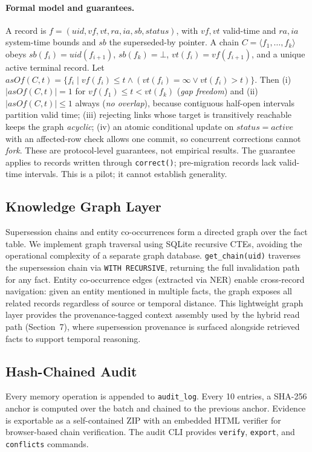 \documentclass{llncs}
\begin{document}
\paragraph{Formal model and guarantees.} A record is $f=(\mathit{uid},\mathit{vf},\mathit{vt},\mathit{ra},\mathit{ia},\mathit{sb},\mathit{status})$, with $\mathit{vf},\mathit{vt}$ valid-time and $\mathit{ra},\mathit{ia}$ system-time bounds and $\mathit{sb}$ the superseded-by pointer. A chain $C=\langle f_1,\ldots,f_k\rangle$ obeys $\mathit{sb}(f_i)=\mathit{uid}(f_{i+1})$, $\mathit{sb}(f_k)=\bot$, $\mathit{vt}(f_i)=\mathit{vf}(f_{i+1})$, and a unique active terminal record. Let $\mathit{asOf}(C,t)=\{f_i\mid \mathit{vf}(f_i)\le t\wedge(\mathit{vt}(f_i)=\infty\vee \mathit{vt}(f_i)>t)\}$. Then (i) $|\mathit{asOf}(C,t)|=1$ for $\mathit{vf}(f_1)\le t<\mathit{vt}(f_k)$ (\emph{gap freedom}) and (ii) $|\mathit{asOf}(C,t)|\le 1$ always (\emph{no overlap}), because contiguous half-open intervals partition valid time; (iii) rejecting links whose target is transitively reachable keeps the graph \emph{acyclic}; (iv) an atomic conditional update on $\mathit{status}{=}\mathit{active}$ with an affected-row check allows one commit, so concurrent corrections cannot \emph{fork}. These are protocol-level guarantees, not empirical results. The guarantee applies to records written through \texttt{correct()}; pre-migration records lack valid-time intervals. This is a pilot; it cannot establish generality. 

\subsection{Knowledge Graph Layer}
\label{sec:graph}

Supersession chains and entity co-occurrences form a directed graph over the fact table. We implement graph traversal using SQLite recursive CTEs, avoiding the operational complexity of a separate graph database. \texttt{get\_chain(uid)} traverses the supersession chain via \texttt{WITH RECURSIVE}, returning the full invalidation path for any fact. Entity co-occurrence edges (extracted via NER) enable cross-record navigation: given an entity mentioned in multiple facts, the graph exposes all related records regardless of source or temporal distance. This lightweight graph layer provides the provenance-tagged context assembly used by the hybrid read path (Section~7), where supersession provenance is surfaced alongside retrieved facts to support temporal reasoning.
\subsection{Hash-Chained Audit}
Every memory operation is appended to \texttt{audit\_log}. Every 10 entries, a SHA-256 anchor is computed over the batch and chained to the previous anchor. Evidence is exportable as a self-contained ZIP with an embedded HTML verifier for browser-based chain verification. The audit CLI provides \texttt{verify}, \texttt{export}, and \texttt{conflicts} commands.
\end{document}
